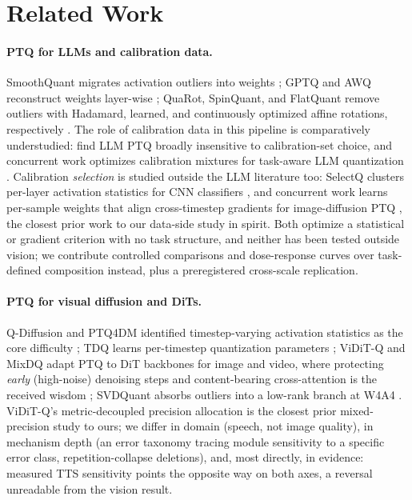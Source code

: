 \section{Related Work}
\paragraph{PTQ for LLMs and calibration data.}
SmoothQuant migrates activation outliers into weights \citep{xiao2023smoothquant}; GPTQ and AWQ reconstruct weights layer-wise \citep{frantar2023gptq,lin2024awq}; QuaRot, SpinQuant, and FlatQuant remove outliers with Hadamard, learned, and continuously optimized affine rotations, respectively \citep{ashkboos2024quarot,liu2025spinquant,sun2025flatquant}. The role of calibration data in this pipeline is comparatively understudied: \citet{williams2024impact} find LLM PTQ broadly insensitive to calibration-set choice, and concurrent work optimizes calibration mixtures for task-aware LLM quantization \citep{wang2026tasa}. Calibration \emph{selection} is studied outside the LLM literature too: SelectQ clusters per-layer activation statistics for CNN classifiers \citep{zhang2025selectq}, and concurrent work learns per-sample weights that align cross-timestep gradients for image-diffusion PTQ \citep{hoang2026gradcalib}, the closest prior work to our data-side study in spirit. Both optimize a statistical or gradient criterion with no task structure, and neither has been tested outside vision; we contribute controlled comparisons and dose-response curves over task-defined composition instead, plus a preregistered cross-scale replication.
 
\paragraph{PTQ for visual diffusion and DiTs.}
Q-Diffusion and PTQ4DM identified timestep-varying activation statistics as the core difficulty \citep{li2023qdiffusion,shang2023ptq4dm}; TDQ learns per-timestep quantization parameters \citep{so2023tdq}; ViDiT-Q and MixDQ adapt PTQ to DiT backbones for image and video, where protecting \emph{early} (high-noise) denoising steps and content-bearing cross-attention is the received wisdom \citep{zhao2025viditq,zhao2024mixdq}; SVDQuant absorbs outliers into a low-rank branch at W4A4 \citep{li2025svdquant}. ViDiT-Q's metric-decoupled precision allocation is the closest prior mixed-precision study to ours; we differ in domain (speech, not image quality), in mechanism depth (an error taxonomy tracing module sensitivity to a specific error class, repetition-collapse deletions), and, most directly, in evidence: measured TTS sensitivity points the opposite way on both axes, a reversal unreadable from the vision result.
 
